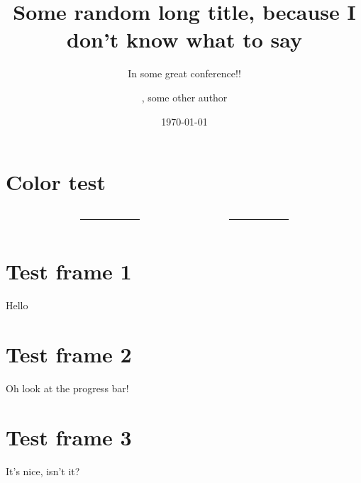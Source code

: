 \documentclass[%
    listings={
        Lean=listings-lean,
        Go
    }
]{custom}
\title[Short title]{Some random long title, because I don't know what to say}
\subtitle{In some great conference!!}
\author[Short author name]{\speaker{Some random author}, some other author}
\institute{Some institute!}
\date{\today}
\begin{document}
\section{Color test}
\begin{sframe}
	\footnotesize
	\sffamily
	\begin{columns}
		\begin{column}{.27\linewidth}
			\begin{testcolors}[HTML]
			\end{testcolors}
		\end{column}
		\begin{column}{.05\linewidth}
			\centering
			\rule{.1mm}{.7\textheight}
		\end{column}
		\begin{column}{.27\linewidth}
			\begin{testcolors}[HTML]
			\end{testcolors}
		\end{column}
		\begin{column}{.05\linewidth}
			\centering
			\rule{.1mm}{.7\textheight}
		\end{column}
		\begin{column}{.27\linewidth}
			\begin{testcolors}[HTML]
			\end{testcolors}
		\end{column}
	\end{columns}
\end{sframe}

\section{Test frame 1}
\begin{sframe}
	Hello
\end{sframe}

\section{Test frame 2}
\begin{sframe}
	Oh look at the progress bar!
\end{sframe}

\section{Test frame 3}
\begin{sframe}
	It's nice, isn't it?
\end{sframe}
\end{document}
